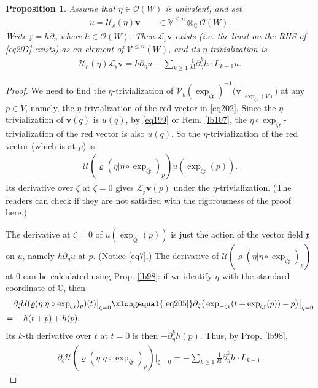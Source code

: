 \documentclass[11pt,b5paper,notitlepage]{article}
\theoremstyle{definition}
\theoremstyle{plain}
\newtheorem{pp}[df]{Proposition}
\newcommand{\mc}{\mathcal}
\newcommand{\scr}{\mathscr}
\newcommand{\xk}{\mathfrak x}
\newcommand{\Vbb}{\mathbb V}
\newcommand{\Cbb}{\mathbb C}
\newcommand{\vbf}{\mathbf v}
\numberwithin{equation}{section}
\begin{document}
\subsection{}

\begin{pp}\label{lb108}
Assume that $\eta\in\scr O(W)$ is univalent, and set
\begin{align*}
u=\mc U_\varrho(\eta)\vbf\qquad\in\Vbb^{\leq n}\otimes_\Cbb\scr O(W).
\end{align*}
Write $\xk=h\partial_\eta$ where $h\in\scr O(W)$. Then $\mc L_\xk\vbf$ exists (i.e. the limit on the RHS of \eqref{eq207} exists) as an element of $\scr V^{\leq n}(W)$, and its $\eta$-trivialization is
\begin{align}
\mc U_\varrho(\eta)\mc L_\xk\vbf=h\partial_\eta u-\sum_{k\geq1} \frac 1{k!}\partial_\eta^k h\cdot L_{k-1}u.\label{eq204}
\end{align}
\end{pp}

\begin{proof}
We need to find the $\eta$-trivialization of $\mc V_\varrho(\exp_{\zeta\xk})^{-1}\big(\vbf\big|_{\exp_{\zeta\xk}(V)}\big)$ at any $p\in V$, namely, the $\eta$-trivialization of  the red vector in  \eqref{eq202}. Since the $\eta$-trivialization of $\vbf(q)$ is $u(q)$, by \eqref{eq199} or Rem. \ref{lb107}, the $\eta\circ\exp_{\zeta\xk}$-trivialization of the red vector is also $u(q)$. So the $\eta$-trivialization of the red vector (which is at $p$) is
\begin{align}
\mc U(\varrho(\eta|\eta\circ\exp_{\zeta\xk})_p)u(\exp_{\zeta\xk}(p))\label{eq203}.
\end{align}
Its derivative over $\zeta$ at $\zeta=0$ gives $\mc L_\xk\vbf(p)$ under the $\eta$-trivialization. (The readers can check \cite[Sec. 2.6]{Gui} if they are not satisfied with the rigorousness of the proof here.)

The derivative at $\zeta=0$ of $u(\exp_{\zeta\xk}(p))$ is just the action of the vector field $\xk$ on $u$, namely $h\partial_\eta u$ at $p$. (Notice \eqref{eq7}.) The derivative of $\mc U(\varrho(\eta|\eta\circ\exp_{\zeta\xk})_p)$ at $0$ can be calculated using Prop. \ref{lb98}: if we identify $\eta$ with the standard coordinate of $\Cbb$, then 
\begin{align*}
&\partial_\zeta\mc U(\varrho(\eta|\eta\circ\exp_{\zeta\xk})_p)(t)\big|_{\zeta=0}\xlongequal{\eqref{eq205}}\partial_\zeta\big(\exp_{-\zeta\xk}(t+\exp_{\zeta\xk}(p))-p\big)\big|_{\zeta=0}\\
=&-h(t+p)+h(p).
\end{align*}
Its $k$-th derivative over $t$ at $t=0$ is then $-\partial_\eta^kh(p)$. Thus, by Prop. \ref{lb98},
\begin{align*}
\partial_\zeta \mc U(\varrho(\eta|\eta\circ\exp_{\zeta\xk})_p)\big|_{\zeta=0}=-\sum_{k\geq1} \frac 1{k!}\partial_\eta^k h\cdot L_{k-1}.
\end{align*}
\end{proof}
\end{document}
